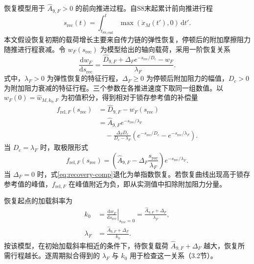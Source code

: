 \documentclass{JQRnew}
\begin{document}
恢复模型用于 $\widehat A_{9,F}>0$ 的前向推进过程。自S8末起累计前向推进行程
\begin{equation}
\label{eq:recovery-travel}
s_{\mathrm{rec}}(t)=\int_{t_{\mathrm{S8,end}}}^{t}
\max\!\left(\dot x_M(t'),0\right)\,\mathrm dt'.
\end{equation}
本文假设恢复初期的载荷增长主要来自传力链的弹性恢复，停顿后的附加摩擦阻力随推进行程衰减。令 $w_F(s_{\mathrm{rec}})$ 为模型给出的轴向载荷，采用一阶恢复关系
\begin{equation}
\label{eq:recovery-ode}
\frac{\mathrm dw_F}{\mathrm ds_{\mathrm{rec}}}
=\frac{\widehat D_{9,F}+\Delta_F e^{-s_{\mathrm{rec}}/D_c}-w_F}{\lambda_F}.
\end{equation}
式中，$\lambda_F>0$ 为弹性恢复的特征行程，$\Delta_F\ge0$ 为停顿后附加阻力的幅值，$D_c>0$ 为附加阻力衰减的特征行程。三个参数在各推进速度下取同一组数值。以 $w_F(0)=\widehat w_{M,k_9,F}$ 为初值积分，得到相对于锁存参考值的补偿量
\begin{equation}
\label{eq:recovery-comp}
\begin{aligned}
f_{\mathrm{rel},F}(s_{\mathrm{rec}})&=\widehat D_{9,F}-w_F(s_{\mathrm{rec}})\\
&=\widehat A_{9,F}e^{-s_{\mathrm{rec}}/\lambda_F}\\
&\quad-\frac{\Delta_FD_c}{D_c-\lambda_F}
\left(e^{-s_{\mathrm{rec}}/D_c}-e^{-s_{\mathrm{rec}}/\lambda_F}\right).
\end{aligned}
\end{equation}
当 $D_c=\lambda_F$ 时，取极限形式
\begin{equation}
\label{eq:equal-scales}
f_{\mathrm{rel},F}(s_{\mathrm{rec}})=
\left(\widehat A_{9,F}-\Delta_F\frac{s_{\mathrm{rec}}}{\lambda_F}\right)e^{-s_{\mathrm{rec}}/\lambda_F}.
\end{equation}
当 $\Delta_F=0$ 时，式\eqref{eq:recovery-comp}退化为单指数恢复。若恢复曲线出现高于锁存参考值的峰值，$f_{\mathrm{rel},F}$ 在峰值附近为负，即从实测值中扣除附加阻力分量。

恢复起点的加载斜率为
\begin{equation}
\label{eq:initial-slope}
\begin{aligned}
k_0&=\left.\frac{\mathrm dw_F}{\mathrm ds_{\mathrm{rec}}}\right|_{s_{\mathrm{rec}}=0}
=\frac{\widehat A_{9,F}+\Delta_F}{\lambda_F},\\
\lambda_F&=\frac{\widehat A_{9,F}+\Delta_F}{k_0}.
\end{aligned}
\end{equation}
按该模型，在初始加载斜率相近的条件下，待恢复载荷 $\widehat A_{9,F}+\Delta_F$ 越大，恢复所需行程越长。逐周期拟合得到的 $\lambda_F$ 与 $k_0$ 用于检查这一关系（3.2节）。
\end{document}
